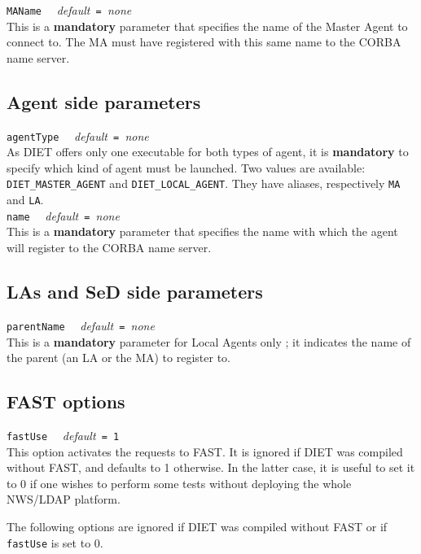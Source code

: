 \noindent
\texttt{MAName} \ \ \emph{default}\texttt{ = }\emph{none}\\
This is a \textbf{mandatory} parameter that specifies the name of the Master
Agent to connect to. The MA must have registered with this same name to the
CORBA name server.


\subsection{Agent side parameters}

\noindent
\texttt{agentType} \ \ \emph{default}\texttt{ = }\emph{none}\\
As DIET offers only one executable for both types of agent, it is
\textbf{mandatory} to specify which kind of agent must be launched. Two values
are available: \texttt{DIET\_MASTER\_AGENT} and \texttt{DIET\_LOCAL\_AGENT}.
They have aliases, respectively \texttt{MA} and \texttt{LA}.
\\

\noindent
\texttt{name} \ \ \emph{default}\texttt{ = }\emph{none}\\
This is a \textbf{mandatory} parameter that specifies the name with
which the agent will register to the CORBA name server.


\subsection{LAs and SeD side parameters}

\noindent
\texttt{parentName} \ \ \emph{default}\texttt{ = }\emph{none}\\
This is a \textbf{mandatory} parameter for Local Agents only ; it indicates the
name of the parent (an LA or the MA) to register to.


\subsection{FAST options}

\noindent
\texttt{fastUse} \ \ \emph{default}\texttt{ = 1}\\
This option activates the requests to FAST. It is ignored if DIET was
compiled without FAST, and defaults to 1 otherwise. In the latter case, it is
useful to set it to 0 if one wishes to perform some tests
without deploying the whole NWS/LDAP platform.

The following options are ignored if DIET was compiled without FAST or if
\texttt{fastUse} is set to 0.

